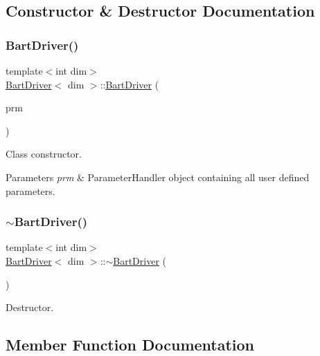 \subsection{Constructor \& Destructor Documentation}
\mbox{\label{class_bart_driver_acad3b3200543d46ab9e4c78b860f822c}} 
\subsubsection{\texorpdfstring{Bart\+Driver()}{BartDriver()}}
{\footnotesize\ttfamily template$<$int dim$>$ \\
\hyperlink{class_bart_driver}{Bart\+Driver}$<$ dim $>$\+::\hyperlink{class_bart_driver}{Bart\+Driver} (\begin{DoxyParamCaption}\item[{Parameter\+Handler \&}]{prm }\end{DoxyParamCaption})}

Class constructor.


\begin{DoxyParams}{Parameters}
{\em prm} & Parameter\+Handler object containing all user defined parameters. \\
\hline
\end{DoxyParams}
\mbox{\label{class_bart_driver_aa89fe626d99cb4013b83d5e99698a9f3}} 
\subsubsection{\texorpdfstring{$\sim$\+Bart\+Driver()}{~BartDriver()}}
{\footnotesize\ttfamily template$<$int dim$>$ \\
\hyperlink{class_bart_driver}{Bart\+Driver}$<$ dim $>$\+::$\sim$\hyperlink{class_bart_driver}{Bart\+Driver} (\begin{DoxyParamCaption}{ }\end{DoxyParamCaption})}



Destructor. 



\subsection{Member Function Documentation}
\mbox{\label{class_bart_driver_ac5d2985a0286bdac161f3c0fbb80197a}} 
